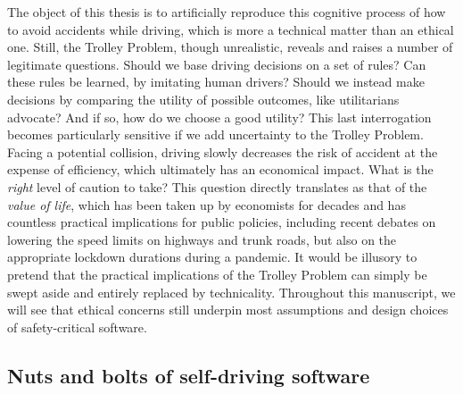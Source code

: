 The object of this thesis is to artificially reproduce this cognitive process of how to avoid accidents while driving, which is more a technical matter than an ethical one. Still, the Trolley Problem, though unrealistic, reveals and raises a number of legitimate questions. Should we base driving decisions on a set of rules? Can these rules be learned, \eg by imitating human drivers? Should we instead make decisions by comparing the utility of possible outcomes, like utilitarians advocate? And if so, how do we choose a good utility? This last interrogation becomes particularly sensitive if we add uncertainty to the Trolley Problem. Facing a potential collision, driving slowly decreases the risk of accident at the expense of efficiency, which ultimately has an economical impact. What is the \emph{right} level of caution to take? This question directly translates as that of the \emph{value of life}, which has been taken up by economists for decades \citep{Abraham1960,Dreze1962,Schelling1968life,Banzhaf2014,Tirole2017,Charpentier2019} and has countless practical implications for public policies, including recent debates on lowering the speed limits on highways and trunk roads, but also on the appropriate lockdown durations during a pandemic.
It would be illusory to pretend that the practical implications of the Trolley Problem can simply be swept aside and entirely replaced by technicality. Throughout this manuscript, we will see that ethical concerns still underpin most assumptions and design choices of safety-critical software.


\subsection{Nuts and bolts of self-driving software}
\label{sec:nuts-and-bolts}


